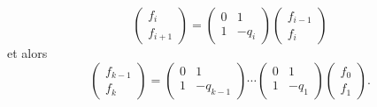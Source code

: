 \begin{displaymath}
  \begin{pmatrix}
    f_{i} \\  f_{i+1} 
  \end{pmatrix}
  =
  \begin{pmatrix}
    0 & 1 \\
    1 & -q_i
  \end{pmatrix}
  \begin{pmatrix}
     f_{i-1} \\  f_{i}
   \end{pmatrix}
\end{displaymath}
et alors
\begin{displaymath}
  \begin{pmatrix}
    f_{k-1} \\ f_k
  \end{pmatrix} =
  \begin{pmatrix}
    0 & 1 \\
    1 & -q_{k-1}
  \end{pmatrix} \cdots
  \begin{pmatrix}
    0 & 1 \\
    1 & -q_{1}
  \end{pmatrix}
  \begin{pmatrix}
    f_0 \\ f_1
  \end{pmatrix}.
\end{displaymath}
